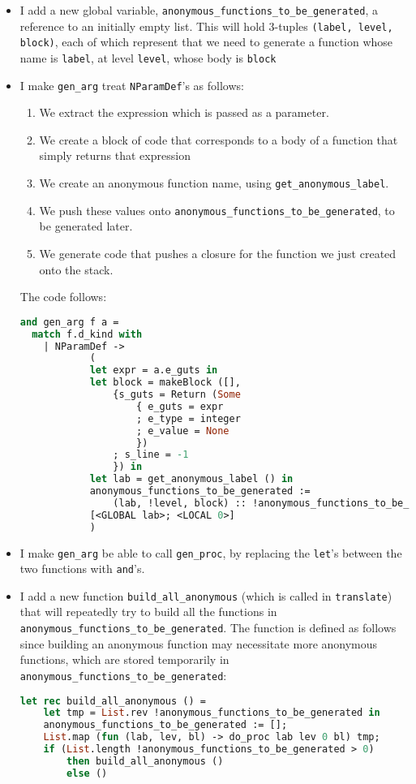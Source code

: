 \documentclass[a4paper,9pt]{article}
\begin{document}
\begin{itemize}
\item I add a new global variable, \texttt{anonymous\_functions\_to\_be\_generated}, a reference to an initially empty list. This will hold 3-tuples \texttt{(label, level, block)}, each of which represent that we need to generate a function whose name is \texttt{label}, at level \texttt{level}, whose body is \texttt{block}
\item I make \texttt{gen\_arg} treat \texttt{NParamDef}'s as follows:
    \begin{enumerate}
        \item We extract the expression which is passed as a parameter.
        \item We create a block of code that corresponds to a body of a function that simply returns that expression
        \item We create an anonymous function name, using \texttt{get\_anonymous\_label}.
        \item We push these values onto \texttt{anonymous\_functions\_to\_be\_generated}, to be generated later.
        \item We generate code that pushes a closure for the function we just created onto the stack.
    \end{enumerate}
    The code follows:
\begin{lstlisting}[language=ml]
and gen_arg f a = 
  match f.d_kind with
    | NParamDef ->
            (
            let expr = a.e_guts in
            let block = makeBlock ([],
                {s_guts = Return (Some 
                    { e_guts = expr
                    ; e_type = integer
                    ; e_value = None
                    })
                ; s_line = -1
                }) in
            let lab = get_anonymous_label () in
            anonymous_functions_to_be_generated := 
                (lab, !level, block) :: !anonymous_functions_to_be_generated;
            [<GLOBAL lab>; <LOCAL 0>]
            )
\end{lstlisting}
    \item I make \texttt{gen\_arg} be able to call \texttt{gen\_proc}, by replacing the \texttt{let}'s between the two functions with \texttt{and}'s.
    \item I add a new function \texttt{build\_all\_anonymous} (which is called in \texttt{translate}) that will repeatedly try to build all the functions in \texttt{anonymous\_functions\_to\_be\_generated}. The function is defined as follows since building an anonymous function may necessitate more anonymous functions, which are stored temporarily in \texttt{anonymous\_functions\_to\_be\_generated}:
\begin{lstlisting}[language=ml]
let rec build_all_anonymous () =
    let tmp = List.rev !anonymous_functions_to_be_generated in
    anonymous_functions_to_be_generated := [];
    List.map (fun (lab, lev, bl) -> do_proc lab lev 0 bl) tmp;
    if (List.length !anonymous_functions_to_be_generated > 0)
        then build_all_anonymous ()
        else ()
\end{lstlisting}
\end{itemize}
\end{document}
